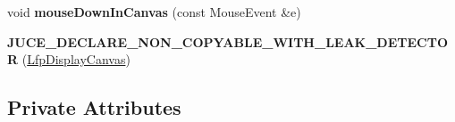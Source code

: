 \begin{DoxyCompactItemize}
\item 
\hypertarget{classLfpDisplayCanvas_ab3278e6eec42cdffaf5900e830872424}{void {\bfseries mouse\-Down\-In\-Canvas} (const Mouse\-Event \&e)}\label{classLfpDisplayCanvas_ab3278e6eec42cdffaf5900e830872424}

\item 
\hypertarget{classLfpDisplayCanvas_ac39b96bb7d4591a9215f9efa87394228}{{\bfseries J\-U\-C\-E\-\_\-\-D\-E\-C\-L\-A\-R\-E\-\_\-\-N\-O\-N\-\_\-\-C\-O\-P\-Y\-A\-B\-L\-E\-\_\-\-W\-I\-T\-H\-\_\-\-L\-E\-A\-K\-\_\-\-D\-E\-T\-E\-C\-T\-O\-R} (\hyperlink{classLfpDisplayCanvas}{Lfp\-Display\-Canvas})}\label{classLfpDisplayCanvas_ac39b96bb7d4591a9215f9efa87394228}

\end{DoxyCompactItemize}
\subsection*{Private Attributes}
